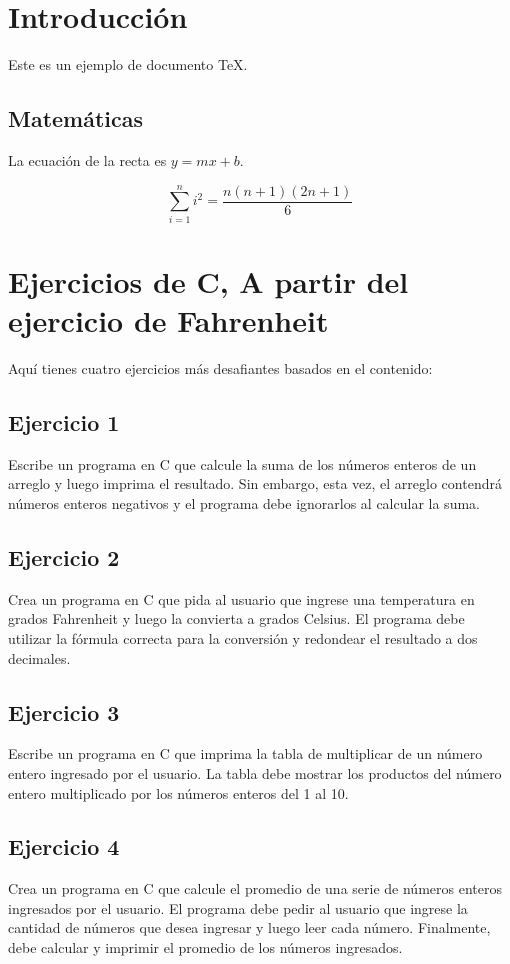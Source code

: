 \documentclass{article}
\begin{document}
\section{Introducción}

Este es un ejemplo de documento TeX.

\subsection{Matemáticas}

La ecuación de la recta es $y = mx + b$.

\[\sum_{i=1}^{n} i^2 = \frac{n(n+1)(2n+1)}{6}\]

\section{Ejercicios de C, A partir del ejercicio de Fahrenheit}

Aquí tienes cuatro ejercicios más desafiantes basados en el contenido:

\subsection{Ejercicio 1}
Escribe un programa en C que calcule la suma de los números enteros de un arreglo y luego imprima el resultado. Sin embargo, esta vez, el arreglo contendrá números enteros negativos y el programa debe ignorarlos al calcular la suma.

\subsection{Ejercicio 2}
Crea un programa en C que pida al usuario que ingrese una temperatura en grados Fahrenheit y luego la convierta a grados Celsius. El programa debe utilizar la fórmula correcta para la conversión y redondear el resultado a dos decimales.

\subsection{Ejercicio 3}
Escribe un programa en C que imprima la tabla de multiplicar de un número entero ingresado por el usuario. La tabla debe mostrar los productos del número entero multiplicado por los números enteros del 1 al 10.

\subsection{Ejercicio 4}
Crea un programa en C que calcule el promedio de una serie de números enteros ingresados por el usuario. El programa debe pedir al usuario que ingrese la cantidad de números que desea ingresar y luego leer cada número. Finalmente, debe calcular y imprimir el promedio de los números ingresados.
\end{document}
